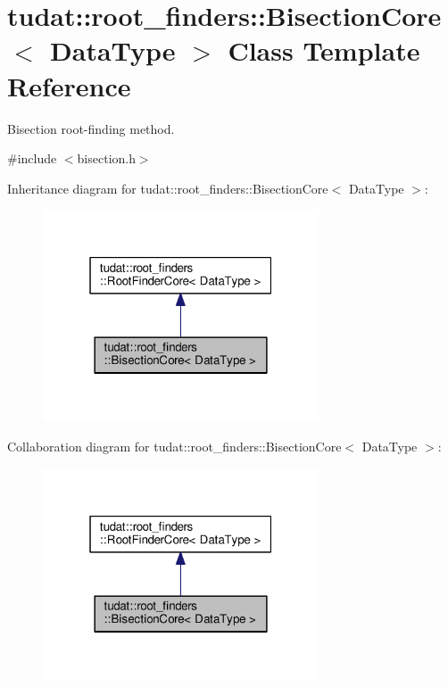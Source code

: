 \hypertarget{classtudat_1_1root__finders_1_1BisectionCore}{}\section{tudat\+:\+:root\+\_\+finders\+:\+:Bisection\+Core$<$ Data\+Type $>$ Class Template Reference}
\label{classtudat_1_1root__finders_1_1BisectionCore}


Bisection root-\/finding method.  




{\ttfamily \#include $<$bisection.\+h$>$}



Inheritance diagram for tudat\+:\+:root\+\_\+finders\+:\+:Bisection\+Core$<$ Data\+Type $>$\+:
\nopagebreak
\begin{figure}[H]
\begin{center}
\leavevmode
\includegraphics[width=232pt]{classtudat_1_1root__finders_1_1BisectionCore__inherit__graph}
\end{center}
\end{figure}


Collaboration diagram for tudat\+:\+:root\+\_\+finders\+:\+:Bisection\+Core$<$ Data\+Type $>$\+:
\nopagebreak
\begin{figure}[H]
\begin{center}
\leavevmode
\includegraphics[width=232pt]{classtudat_1_1root__finders_1_1BisectionCore__coll__graph}
\end{center}
\end{figure}
